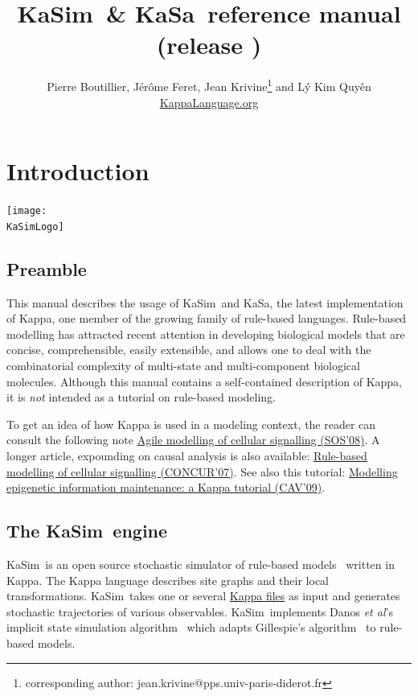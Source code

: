 \documentclass[11pt]{book}
\title{KaSim~\& KaSa~reference manual\\ \small (release \version)}
\author{Pierre Boutillier, J\'er\^ome Feret, Jean Krivine\thanks{corresponding author: jean.krivine@pps.univ-paris-diderot.fr} and L\'y Kim Quy\^en \\\href{http://www.kappalanguage.org}{KappaLanguage.org}}
\date{}
\def\KaSimLogo{img/KaSim-Logo.pdf}
\def\KaSim{\textsf{KaSim}}
\def\KaSa{\textsf{KaSa}}
\begin{document}
\maketitle


\tableofcontents
\listoftables

\chapter{Introduction}
\begin{center}\texttt{[image: \\KaSimLogo]}\end{center}

\section{Preamble}
This manual describes the usage of \KaSim~and \KaSa, the latest implementation of Kappa, one member of the growing family of rule-based languages. Rule-based modelling has attracted recent attention in developing biological models that are concise, comprehensible, easily extensible, and allows one to deal with the combinatorial complexity of multi-state and multi-component biological molecules. 
Although this manual contains a self-contained description of Kappa, it is \emph{not} intended as a tutorial on rule-based modeling.%
%

To get an idea of how Kappa is used in a modeling context, the reader can consult the following note \href{http://www.pps.jussieu.fr/~danos/pdf/eov.pdf}{Agile modelling of cellular signalling (SOS'08)}. A longer article, expounding on causal analysis is also available: \href{http://www.pps.jussieu.fr/~danos/pdf/ka-fix.pdf}{Rule-based modelling of cellular signalling (CONCUR'07)}. See also this tutorial: \href{http://www.pps.jussieu.fr/~danos/pdf/mytdg.pdf}{Modelling epigenetic information maintenance: a Kappa tutorial (CAV'09)}.




\section{The \KaSim~engine}
\KaSim~is an open source stochastic simulator of rule-based models~\cite{DanLan04,Dan_etal07a,Fae_etal05} written in Kappa. The Kappa language describes site graphs and their local transformations. \KaSim~takes one or several \hyperref[chap:kappa]{Kappa files} as input and generates stochastic trajectories of various observables. \KaSim~implements Danos \textit{et al}'s implicit state simulation algorithm~\cite{Dan_etal07b} which adapts Gillespie's algorithm~\cite{Gil76,Gil77} to rule-based models. 
\end{document}
